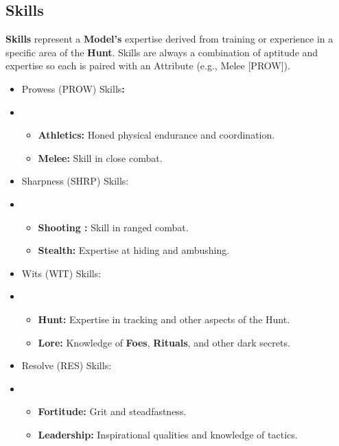 \documentclass[
]{book}
\providecommand{\tightlist}{%
  \setlength{\itemsep}{0pt}\setlength{\parskip}{0pt}}
\begin{document}
\hypertarget{skills}{%
\subsection*{Skills}\label{skills}}

\textbf{Skills} represent a \textbf{Model's} expertise derived from training or experience in a specific area of the \textbf{Hunt}. Skills are always a combination of aptitude and expertise so each is paired with an Attribute (e.g., Melee {[}PROW{]}).

\begin{itemize}
\item
  Prowess (PROW) Skills\textbf{:}
\item
  \begin{itemize}
  \tightlist
  \item
    \textbf{Athletics:} Honed physical endurance and coordination.
  \item
    \textbf{Melee:} Skill in close combat.
  \end{itemize}
\item
  Sharpness (SHRP) Skills:
\item
  \begin{itemize}
  \tightlist
  \item
    \textbf{Shooting :} Skill in ranged combat.
  \item
    \textbf{Stealth:} Expertise at hiding and ambushing.
  \end{itemize}
\item
  Wits (WIT) Skills:
\item
  \begin{itemize}
  \tightlist
  \item
    \textbf{Hunt:} Expertise in tracking and other aspects of the Hunt.
  \item
    \textbf{Lore:} Knowledge of \textbf{Foes}, \textbf{Rituals}, and other dark secrets.
  \end{itemize}
\item
  Resolve (RES) Skills:
\item
  \begin{itemize}
  \tightlist
  \item
    \textbf{Fortitude:} Grit and steadfastness.
  \item
    \textbf{Leadership:} Inspirational qualities and knowledge of tactics.
  \end{itemize}
\end{itemize}
\end{document}
